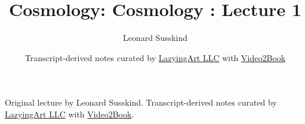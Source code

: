 \documentclass[11pt,oneside]{book}
\begin{document}
\frontmatter
\title{Cosmology: Cosmology : Lecture 1}
\author{Leonard Susskind}
\date{Transcript-derived notes curated by \href{https://lazying.art}{LazyingArt LLC} with \href{https://github.com/lachlanchen/Video2Book}{Video2Book}}
\maketitle
\begin{center}
\small Original lecture by Leonard Susskind. Transcript-derived notes curated by \href{https://lazying.art}{LazyingArt LLC} with \href{https://github.com/lachlanchen/Video2Book}{Video2Book}.
\end{center}
\clearpage
\mainmatter

\end{document}

